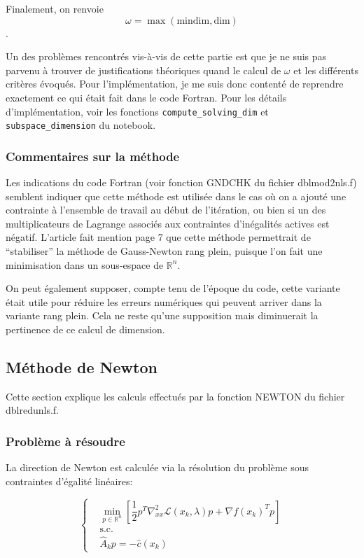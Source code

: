 \documentclass[a4paper,11pt]{article}
\newcommand{\real}{\mathbb{R}}
\newcommand{\ha}{\hat{A}}
\numberwithin{equation}{section}
\def\mfabian#1{{\color{blue} #1}}
\begin{document}
Finalement, on renvoie
$$\omega = \max(\text{mindim},\text{dim})$$.
 
 
Un des problèmes rencontrés vis-à-vis de cette partie est que je ne suis pas parvenu à trouver de justifications théoriques quand le calcul de $\omega$ et les différents critères évoqués. Pour l'implémentation, je me suis donc contenté de reprendre exactement ce qui était fait dans le code Fortran. Pour les détails d'implémentation, voir les fonctions \texttt{compute\_solving\_dim} et \texttt{subspace\_dimension} du notebook.


\subsubsection{Commentaires sur la méthode}

Les indications du code Fortran (voir fonction GNDCHK du fichier dblmod2nls.f) semblent indiquer que cette méthode est utilisée dans le cas où on a ajouté une contrainte à l'ensemble de travail au début de l'itération, ou bien si un des multiplicateurs de Lagrange associés aux contraintes d'inégalités actives est négatif. L'article \cite{lindstromwedin1988} fait mention page 7 que cette méthode permettrait de \mfabian{``stabiliser''} la méthode de Gauss-Newton rang plein, puisque l'on fait une minimisation dans un sous-espace de $\real^{n}$. 

On peut également supposer, compte tenu de l'époque du code, cette variante était utile pour réduire les erreurs numériques qui peuvent arriver dans la variante rang plein. Cela ne reste qu'une supposition mais diminuerait la pertinence de ce calcul de dimension.


\subsection{Méthode de Newton} \label{newtonmethod}

Cette section explique les calculs effectués par la fonction NEWTON du fichier dblredunls.f.
\subsubsection{Problème à résoudre}

La direction de Newton est calculée via la résolution du problème sous contraintes d'égalité linéaires:

$$
\left\{ \begin{aligned}
&\underset{p \in \real^{n}}{\min}\left[ \dfrac{1}{2}p^{T}\nabla_{xx}^{2}\mathcal{L}(x_{k},\lambda)p + \nabla f(x_{k})^{T}p\right]\\
&\text{s.c.}\\
&\ha_{k} p = -\hat{c}(x_{k})
\end{aligned} \right.
$$
\end{document}
